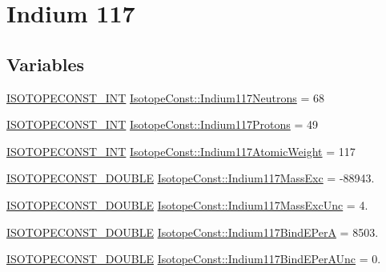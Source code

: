 \hypertarget{group___isotope_const-_indium-_in117}{}\section{Indium 117}
\label{group___isotope_const-_indium-_in117}
\subsection*{Variables}
\begin{DoxyCompactItemize}
\item 
\mbox{\hyperlink{group___isotope_const-_macros_ga5f18360b3e99483a35c32d789e62621c}{I\+S\+O\+T\+O\+P\+E\+C\+O\+N\+S\+T\+\_\+\+I\+NT}} \mbox{\hyperlink{group___isotope_const-_indium-_in117_gaedb6becda9a8672b1e565fb32aa70253}{Isotope\+Const\+::\+Indium117\+Neutrons}} = 68
\item 
\mbox{\hyperlink{group___isotope_const-_macros_ga5f18360b3e99483a35c32d789e62621c}{I\+S\+O\+T\+O\+P\+E\+C\+O\+N\+S\+T\+\_\+\+I\+NT}} \mbox{\hyperlink{group___isotope_const-_indium-_in117_ga2eff13d53b5acde93dd5d29478a8bd5a}{Isotope\+Const\+::\+Indium117\+Protons}} = 49
\item 
\mbox{\hyperlink{group___isotope_const-_macros_ga5f18360b3e99483a35c32d789e62621c}{I\+S\+O\+T\+O\+P\+E\+C\+O\+N\+S\+T\+\_\+\+I\+NT}} \mbox{\hyperlink{group___isotope_const-_indium-_in117_ga4fea8f0433831400c743e3977098b74b}{Isotope\+Const\+::\+Indium117\+Atomic\+Weight}} = 117
\item 
\mbox{\hyperlink{group___isotope_const-_macros_ga8f45a7272ce02c0b4c65c44636ed719a}{I\+S\+O\+T\+O\+P\+E\+C\+O\+N\+S\+T\+\_\+\+D\+O\+U\+B\+LE}} \mbox{\hyperlink{group___isotope_const-_indium-_in117_ga4a9718027c15179e442d5b432b3e45cc}{Isotope\+Const\+::\+Indium117\+Mass\+Exc}} = -\/88943.
\item 
\mbox{\hyperlink{group___isotope_const-_macros_ga8f45a7272ce02c0b4c65c44636ed719a}{I\+S\+O\+T\+O\+P\+E\+C\+O\+N\+S\+T\+\_\+\+D\+O\+U\+B\+LE}} \mbox{\hyperlink{group___isotope_const-_indium-_in117_ga794de3c74a78ec2ed10d3a0be21dfc7a}{Isotope\+Const\+::\+Indium117\+Mass\+Exc\+Unc}} = 4.
\item 
\mbox{\hyperlink{group___isotope_const-_macros_ga8f45a7272ce02c0b4c65c44636ed719a}{I\+S\+O\+T\+O\+P\+E\+C\+O\+N\+S\+T\+\_\+\+D\+O\+U\+B\+LE}} \mbox{\hyperlink{group___isotope_const-_indium-_in117_ga3f54f10f00935077a8df205575469ed0}{Isotope\+Const\+::\+Indium117\+Bind\+E\+PerA}} = 8503.
\item 
\mbox{\hyperlink{group___isotope_const-_macros_ga8f45a7272ce02c0b4c65c44636ed719a}{I\+S\+O\+T\+O\+P\+E\+C\+O\+N\+S\+T\+\_\+\+D\+O\+U\+B\+LE}} \mbox{\hyperlink{group___isotope_const-_indium-_in117_gaf3c4a8a01e39b5090b919fed4399988a}{Isotope\+Const\+::\+Indium117\+Bind\+E\+Per\+A\+Unc}} = 0.

\end{DoxyCompactItemize}
